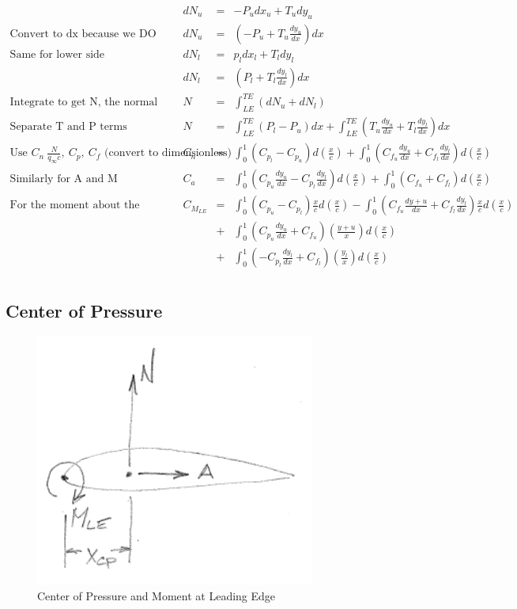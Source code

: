 \documentclass[draft=false, titlepage]{article}
\begin{document}
\begin{equation*}
    \renewcommand{\arraystretch}{1.75}
    \begin{array}{lrcl}
         & dN_u &=& -P_udx_u + T_u dy_u \\
         \text{Convert to dx because we DO NOT KNOW dy} & dN_u &=& (-P_u + T_u \frac{dy_u}{dx}) dx \\
         \text{Same for lower side} & dN_l &=& p_ldx_l + T_ldy_l \\
         & dN_l &=& (P_l + T_l \frac{dy_l}{dx})dx \\
         \text{Integrate to get N, the normal force} &
         N &=& \int_{LE}^{TE}(dN_u + dN_l) \\
         \text{Separate T and P terms} & N &=& \int_{LE}^{TE}(P_l - P_u)dx + \int_{LE}^{TE}(T_u\frac{dy_u}{dx} + T_l\frac{dy_l}{dx})dx \\
         \text{Use } C_n \ \frac{N}{q_\infty c},\ C_p,\ C_f \text{ (convert to dimensionless)} &
         C_n &=& \int_0^1(C_{p_l} - C_{p_u})d(\frac{x}{c}) + \int_0^1(C_{f_u}\frac{dy_u}{dx} + C_{f_l}\frac{dy_l}{dx})d(\frac{x}{c}) \\
         
         \text{Similarly for A and M} &
         C_a &=& \int_0^1(C_{p_u}\frac{dy_u}{dx} - C_{p_l}\frac{dy_l}{dx})d(\frac{x}{c}) + \int_0^1(C_{f_u} + C_{f_l})d(\frac{x}{c}) \\
         
         \text{For the moment about the leading edge:} & C_{M_{LE}} &=& \int_0^1(C_{p_u} - C_{p_l})\frac{x}{c}d(\frac{x}{c}) - \int_0^1 (C_{f_u}\frac{dy+u}{dx} + C_{f_l}\frac{dy_l}{dx}) \frac{x}{c}d(\frac{x}{c}) \\
         & &+& \int_0^1(C_{p_u}\frac{dy_u}{dx} + C_{f_u})(\frac{y+u}{x})d(\frac{x}{c}) \\
         & &+& \int_0^1 (-C_{p_l}\frac{dy_l}{dx} + C_{f_l})(\frac{y_l}{x})d(\frac{x}{c}) \\
    \end{array}
\end{equation*}

\subsection{Center of Pressure}
\begin{figure}[ht]
    \centering
    \includegraphics[width=0.3\linewidth]{Figures/center_of_pressure.PNG}
    \caption{Center of Pressure and Moment at Leading Edge}
    \label{fig:center_of_pressure}
\end{figure}
\end{document}
